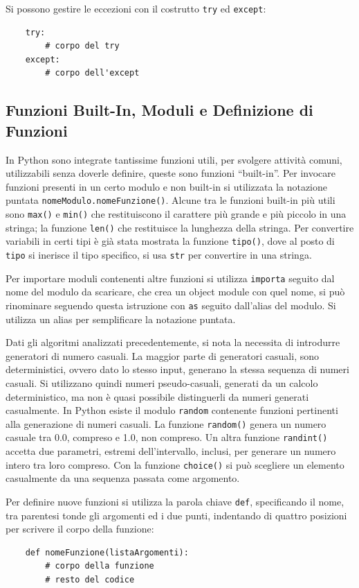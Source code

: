 \documentclass{article}
\numberwithin{equation}{subsection}
\begin{document}
Si possono gestire le eccezioni con il costrutto \verb|try| ed \verb|except|:
\begin{verbatim}
    try:
        # corpo del try
    except:
        # corpo dell'except
\end{verbatim}

\subsection{Funzioni Built-In, Moduli e Definizione di Funzioni}

In Python sono integrate tantissime funzioni utili, per svolgere attività comuni, utilizzabili senza doverle definire, queste sono funzioni ``built-in''. 
Per invocare funzioni presenti in un certo modulo e non built-in si utilizzata la notazione puntata \verb|nomeModulo.nomeFunzione()|. Alcune tra le funzioni 
built-in più utili sono \verb|max()| e \verb|min()| che restituiscono il carattere più grande e più piccolo in una stringa; la funzione \verb|len()| che restituisce 
la lunghezza della stringa. Per convertire variabili in certi tipi è già stata mostrata la funzione \verb|tipo()|, dove al posto di \verb|tipo| si inerisce il 
tipo specifico, si usa \verb|str| per convertire in una stringa. 

Per importare moduli contenenti altre funzioni si utilizza \verb|importa| seguito dal nome del modulo da scaricare, che crea un object module con quel nome, si può 
rinominare seguendo questa istruzione con \verb|as| seguito dall'alias del modulo. Si utilizza un alias per semplificare la notazione puntata. 


Dati gli algoritmi analizzati precedentemente, si nota la necessita di introdurre generatori di numero casuali. La maggior parte di generatori casuali, sono deterministici, 
ovvero dato lo stesso input, generano la stessa sequenza di numeri casuali. Si utilizzano quindi numeri pseudo-casuali, generati da un calcolo deterministico, ma non è quasi possibile 
distinguerli da numeri generati casualmente. In Python esiste il modulo \verb|random| contenente funzioni pertinenti alla generazione di numeri casuali. La 
funzione \verb|random()| genera un numero casuale tra 0.0, compreso e 1.0, non compreso. Un altra funzione \verb|randint()| accetta due parametri, estremi 
dell'intervallo, inclusi, per generare un numero intero tra loro compreso. Con la funzione \verb|choice()| si può scegliere un elemento casualmente da una sequenza 
passata come argomento. 

Per definire nuove funzioni si utilizza la parola chiave \verb|def|, specificando il nome, tra parentesi tonde gli argomenti ed i due punti, indentando di quattro posizioni 
per scrivere il corpo della funzione:
\begin{verbatim}
    def nomeFunzione(listaArgomenti):
        # corpo della funzione
        # resto del codice
\end{verbatim}
\end{document}
